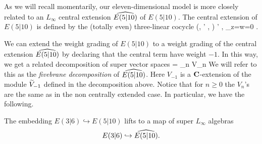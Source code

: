 \documentclass[11pt]{amsart}
\begin{document}
\parsec[s:e510central]

As we will recall momentarily, our eleven-dimensional model is more closely related to an $L_\infty$ central extension $\Hat{E(5|10)}$ of $E(5|10)$\cite[\S 3]{RSW}. 
The central extension of $E(5|10)$ is defined by the (totally even) three-linear cocycle
\beqn\label{eqn:e510central}
(\mu, \mu' , \alpha) \mapsto \<\mu \wedge \mu' , \alpha\>_{z=w=0} \in \C .
\eeqn

We can extend the weight grading of $E(5|10)$ to a weight grading of the central extension $\Hat{E(5|10)}$ by declaring that the central term have weight $-1$.
In this way, we get a related decomposition of super vector spaces
\beqn\label{eqn:decomp1}
 = \prod_{n } V_n
\eeqn
We will refer to this as the \textit{fivebrane decomposition} of $\Hat{E(5|10)}$.
Here $V_{-1}$ is a $\C$-extension of the module $\til V_{-1}$ defined in the decomposition above.
Notice that for $n \geq 0$ the $V_n$'s are the same as in the non centrally extended case.
In particular, we have the following. 

\begin{lem} 
The embedding $E(3|6) \hookrightarrow E(5|10)$ lifts to a map of super $L_\infty$ algebras 
\[
E(3|6) \hookrightarrow \Hat{E(5|10)} .
\]
\end{lem}

\end{document}
